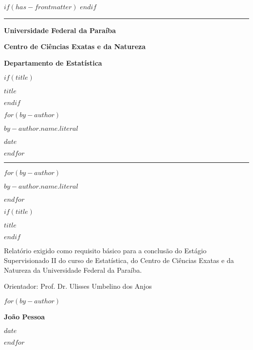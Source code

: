 $if(has-frontmatter)$
$endif$
\cleardoublepage
\thispagestyle{empty}
{\centering
\noindent\rule{\textwidth}{0.5pt}

\vspace{2ex}

{\Large\bfseries Universidade Federal da Paraíba \par}
\vspace{1ex}
{\Large\bfseries Centro de Ciências Exatas e da Natureza \par}
\vspace{1ex}
{\Large\bfseries Departamento de Estatística \par}

\vfill

$if(title)$
{\large\bfseries $title$ \par}
$endif$

\vfill

$for(by-author)$
{\large $by-author.name.literal$ \par}
\vfill
{\normalsize $date$ \par}
$endfor$


\noindent\rule{\textwidth}{0.5pt}

\newpage
\thispagestyle{empty}

$for(by-author)$
{\normalsize\bfseries $by-author.name.literal$ \par}
$endfor$

\vfill

$if(title)$
{\large\bfseries $title$ \par}
$endif$

\vfill

\hfill \parbox{8cm}{\normalsize{Relatório exigido como requisito básico para a conclusão do Estágio Supervisionado II do curso de Estatística, do Centro de Ciências Exatas e da Natureza da Universidade Federal da Paraíba.}}

\vfill

{\normalsize Orientador: Prof. Dr. Ulisses Umbelino dos Anjos}

\vfill

$for(by-author)$
{\normalsize\bfseries João Pessoa \par}
{\normalsize\bfseries $date$ \par}
$endfor$

}
